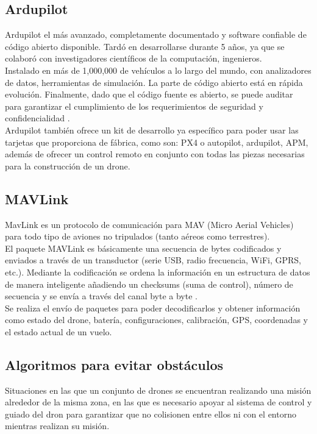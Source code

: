\subsection{Ardupilot}
Ardupilot el más avanzado, completamente documentado y software confiable de 
código abierto disponible. Tardó en desarrollarse durante 5 años, ya que se 
colaboró con investigadores científicos de la computación, ingenieros. \\
Instalado en más de 1,000,000 de vehículos a lo largo del mundo, con 
analizadores de datos, herramientas de simulación. La parte de código abierto 
está en rápida evolución. Finalmente, dado que el código fuente es abierto, se 
puede auditar para garantizar el cumplimiento de los requerimientos de seguridad 
y confidencialidad \cite{ardupilot_dev}. \\
Ardupilot también ofrece un kit de desarrollo ya específico para poder usar las 
tarjetas que proporciona de fábrica, como son: PX4 o autopilot, ardupilot, APM, 
además de ofrecer un control remoto en conjunto con todas las piezas necesarias 
para la construcción de un drone.

\subsection{MAVLink}
MavLink es un protocolo de comunicación para MAV (Micro Aerial Vehicles) para todo tipo de aviones no tripulados (tanto aéreos como terrestres). \\
El paquete MAVLink es básicamente una secuencia de bytes codificados y enviados a través de un transductor (serie USB, radio frecuencia, WiFi, GPRS, etc.). Mediante la codificación se ordena la información en un estructura de datos de manera inteligente añadiendo un checksums (suma de control), número de secuencia y se envía a través del canal byte a byte \cite{mavlink}. \\

Se realiza el envío de paquetes para poder decodificarlos y obtener información como estado del drone, batería, configuraciones, calibración, GPS, coordenadas y el estado actual de un vuelo.

\subsection{Algoritmos para evitar obstáculos}
Situaciones en las que un conjunto de drones se encuentran realizando una misión alrededor de la misma zona, en las que es necesario apoyar al sistema de control y guiado del dron para garantizar que no colisionen entre ellos ni con el entorno mientras realizan su misión. \\

